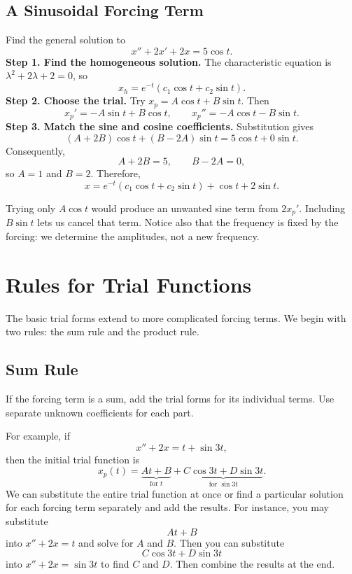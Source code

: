 \documentclass[10pt,letterpaper]{article}
\begin{document}
\subsection{A Sinusoidal Forcing Term}
\begin{example}{Find the general solution to
\[
x''+2x'+2x=5\cos t.
\]}
\textbf{Step 1. Find the homogeneous solution.}
The characteristic equation is $\lambda^2+2\lambda+2=0$, so
\[
x_h=e^{-t}(c_1\cos t+c_2\sin t).
\]
\textbf{Step 2. Choose the trial.}
Try $x_p=A\cos t+B\sin t$. Then
\[
x_p'=-A\sin t+B\cos t,\qquad x_p''=-A\cos t-B\sin t.
\]
\textbf{Step 3. Match the sine and cosine coefficients.}
Substitution gives
\[
(A+2B)\cos t+(B-2A)\sin t=5\cos t+0\sin t.
\]
Consequently,
\[
A+2B=5,\qquad B-2A=0,
\]
so $A=1$ and $B=2$. Therefore,
\[
\boxed{x=e^{-t}(c_1\cos t+c_2\sin t)+\cos t+2\sin t.}
\]
\end{example}
Trying only $A\cos t$ would produce an unwanted sine term from $2x_p'$.
Including $B\sin t$ lets us cancel that term. Notice also that the
frequency is fixed by the forcing: we determine the amplitudes, not a new frequency.

\section{Rules for Trial Functions}

The basic trial forms extend to more complicated forcing terms.
We begin with two rules: the sum rule and the product rule.

\subsection{Sum Rule}

If the forcing term is a sum, add the trial forms for its
individual terms. Use separate unknown coefficients for
each part.

For example, if
\[
x''+2x=t+\sin 3t,
\]
then the initial trial function is
\[
x_p(t)=
\underbrace{At+B}_{\text{for }t}
+
\underbrace{C\cos 3t+D\sin 3t}_{\text{for }\sin 3t}.
\]
We can substitute the entire trial function at once or
find a particular solution for each forcing term separately
and add the results. For instance, you may substitute 
$$
At+B
$$
into $x''+2x=t$ and solve for $A$ and $B$. Then you can 
substitute
$$
C\cos3t+D\sin3t
$$
into $x''+2x=\sin3t$ to find $C$ and $D$. Then combine the results at the end.
\end{document}
